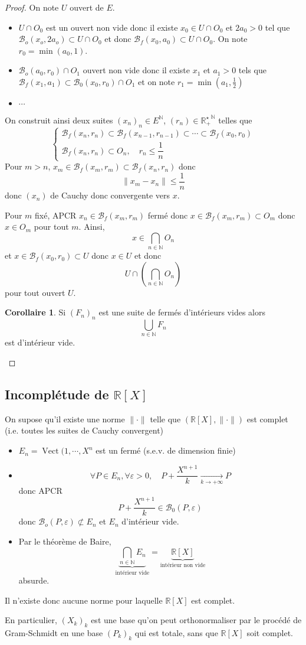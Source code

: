 \documentclass{article}
\theoremstyle{definition}
\newtheorem*{cor}{Corollaire}
\DeclareMathOperator{\Vect}{Vect}
\begin{document}
\begin{proof}
On note $U$ ouvert de $E$.
\begin{itemize}
    \item
$U\cap O_0$ est un ouvert non vide donc il existe $x_0\in U\cap O_0$ et $2a_0>0$ tel que $\mathcal B_o(x_o, 2a_o)\subset U\cap O_0$ et donc $\mathcal B_f(x_0, a_0)\subset U\cap O_0$. On note $r_0=\min(a_0, 1)$.
\item $\mathcal B_o(a_0, r_0)\cap O_1$ ouvert non vide donc il existe $x_1$ et $a_1>0$ tels que $\mathcal B_f(x_1, a_1)\subset \mathcal B_0(x_0, r_0)\cap O_1$ et on note $r_1=\min\left(a_1, \frac12\right)$

\item $\cdots$
\end{itemize}
On construit ainsi deux suites $(x_n)_n\in E^{\mathbb N}$, $(r_n)\in\mathbb {R_+^\star}^{\mathbb N}$ telles que \[
    \begin{cases}
        \mathcal B_f(x_n, r_n)\subset \mathcal B_f(x_{n-1}, r_{n-1})\subset \cdots \subset \mathcal B_f(x_0, r_0) \\
        \mathcal B_f(x_n, r_n)\subset O_n, \quad r_n\leq \dfrac 1n
    \end{cases}
\]
Pour $m>n$, $x_m\in\mathcal B_f(x_m, r_m)\subset\mathcal B_f(x_n, r_n)$ donc \[
    \|x_m-x_n\|\leq \frac 1n
\]
donc $(x_n)$ de Cauchy donc convergente vers $x$.

Pour $m$ fixé, APCR $x_n\in\mathcal B_f(x_m, r_m)$ fermé donc $x\in\mathcal B_f(x_m, r_m)\subset O_m$ donc $x\in O_m$ pour tout $m$. Ainsi, \[
    x\in\bigcap_{n\in\mathbb N}O_n
\]
et $x\in\mathcal B_f(x_0, r_0)\subset U$ donc $x\in U$ et donc \[
    U\cap\left(\bigcap_{n\in\mathbb N}O_n\right)
\]
pour tout ouvert $U$.

\begin{cor}
Si $(F_n)_n$ est une suite de fermés d'intérieurs vides alors \[
    \bigcup_{n\in\mathbb N}F_n
\] est d'intérieur vide.
\end{cor}
\end{proof}

\subsection{Incomplétude de $\mathbb R[X]$}

On supose qu'il existe une norme $\|\cdot \|$ telle que $(\mathbb R[X], \|\cdot \|)$ est complet (i.e. toutes les suites de Cauchy convergent)

\begin{itemize}
    \item $E_n=\Vect(1, \cdots, X^n$ est un fermé (s.e.v. de dimension finie)
    \item \[
    \forall P\in E_n, \forall \varepsilon>0, \quad P+\frac{X^{n+1}}k\xrightarrow[k\to+\infty]{} P
    \] donc APCR \[
        P+\frac{X^{n+1}}k \in \mathcal B_0(P, \varepsilon)
    \]
    donc $\mathcal B_o(P, \varepsilon)\not\subset E_n$ et $E_n$ d'intérieur vide.
    \item Par le théorème de Baire, \[
        \underbrace{\bigcap_{n\in\mathbb N} E_n}_{\text{intérieur vide}}=\underbrace{\mathbb R[X]}_{\text{intérieur non vide}}
    \]
    absurde.
\end{itemize}

Il n'existe donc aucune norme pour laquelle $\mathbb R[X]$ est complet.

En particulier, $(X_k)_k$ est une base qu'on peut orthonormaliser par le procédé de Gram-Schmidt en une base $(P_k)_k$ qui est totale, sans que $\mathbb R[X]$ soit complet.
\end{document}
